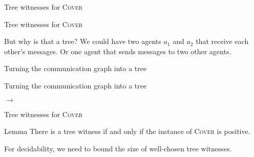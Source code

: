 \documentclass{beamer}
\newcommand{\COVER}{\textsc{Cover}\xspace}
\begin{document}
\begin{frame}{Tree witnesses for \COVER}
	
	\centering
	
	
\end{frame}

\begin{frame}{Tree witnesses for \COVER}
	\begin{center}
	\resizebox{!}{4.5cm}{
	
	}
	\end{center}
\pause
But why is that a tree? We could have two agents $a_1$ and $a_2$ that receive each other's messages. Or one agent that sends messages to two other agents. 
\end{frame}

\begin{frame}{Turning the communication graph into a tree}
\centering

\end{frame}

\begin{frame}{Turning the communication graph into a tree}
\begin{minipage}{0.55\linewidth}
\centering
\resizebox{6.5cm}{!}{

}
\end{minipage}
\begin{minipage}{0.1\linewidth}
$\longrightarrow$
\end{minipage}
\begin{minipage}{0.25 \linewidth}
\resizebox{!}{5cm}{

}
\end{minipage}
\hfill
\end{frame}

\begin{frame}{Tree witnesses for \COVER}
	\begin{center}
	\resizebox{!}{4.5cm}{
	
	}
	\end{center}

\begin{block}{Lemma}
There is a tree witness if and only if the instance of \COVER is positive.  
\end{block}
For decidability, we need to bound the size of well-chosen tree witnesses.
\end{frame}
\end{document}
